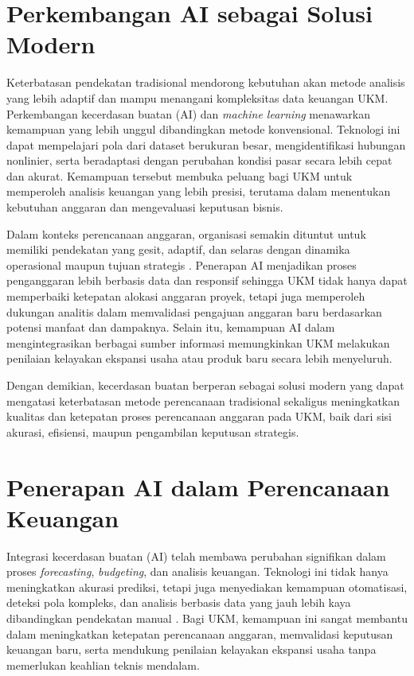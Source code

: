 \section{Perkembangan AI sebagai Solusi Modern}

Keterbatasan pendekatan tradisional mendorong kebutuhan akan metode analisis yang lebih adaptif dan mampu menangani kompleksitas data keuangan UKM. Perkembangan kecerdasan buatan (AI) dan \textit{machine learning} menawarkan kemampuan yang lebih unggul dibandingkan metode konvensional. Teknologi ini dapat mempelajari pola dari dataset berukuran besar, mengidentifikasi hubungan nonlinier, serta beradaptasi dengan perubahan kondisi pasar secara lebih cepat dan akurat. Kemampuan tersebut membuka peluang bagi UKM untuk memperoleh analisis keuangan yang lebih presisi, terutama dalam menentukan kebutuhan anggaran dan mengevaluasi keputusan bisnis.

Dalam konteks perencanaan anggaran, organisasi semakin dituntut untuk memiliki pendekatan yang gesit, adaptif, dan selaras dengan dinamika operasional maupun tujuan strategis \autocite{marotta2022}. Penerapan AI menjadikan proses penganggaran lebih berbasis data dan responsif sehingga UKM tidak hanya dapat memperbaiki ketepatan alokasi anggaran proyek, tetapi juga memperoleh dukungan analitis dalam memvalidasi pengajuan anggaran baru berdasarkan potensi manfaat dan dampaknya. Selain itu, kemampuan AI dalam mengintegrasikan berbagai sumber informasi memungkinkan UKM melakukan penilaian kelayakan ekspansi usaha atau produk baru secara lebih menyeluruh.

Dengan demikian, kecerdasan buatan berperan sebagai solusi modern yang dapat mengatasi keterbatasan metode perencanaan tradisional sekaligus meningkatkan kualitas dan ketepatan proses perencanaan anggaran pada UKM, baik dari sisi akurasi, efisiensi, maupun pengambilan keputusan strategis.

\section{Penerapan AI dalam Perencanaan Keuangan}
Integrasi kecerdasan buatan (AI) telah membawa perubahan signifikan dalam proses \textit{forecasting}, \textit{budgeting}, dan analisis keuangan. Teknologi ini tidak hanya meningkatkan akurasi prediksi, tetapi juga menyediakan kemampuan otomatisasi, deteksi pola kompleks, dan analisis berbasis data yang jauh lebih kaya dibandingkan pendekatan manual \autocite{wasserbacher2022}. Bagi UKM, kemampuan ini sangat membantu dalam meningkatkan ketepatan perencanaan anggaran, memvalidasi keputusan keuangan baru, serta mendukung penilaian kelayakan ekspansi usaha tanpa memerlukan keahlian teknis mendalam.

